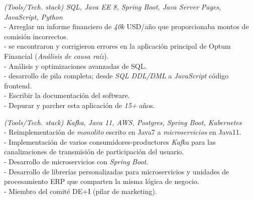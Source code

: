 \documentclass[]{CV-JuanCamiloFlorez}
\begin{document}
\begin{minipage}[t]{0.66\textwidth}
    \noindent
    \textit{(Tools/Tech. stack) SQL, Java EE 8, Spring Boot, Java Server Pages, JavaScript, Python} \\
        - Arreglar un informe financiero de \textit{40k} USD/año que proporcionaba montos de comisión incorrectos. \\
        - se encontraron y corrigieron errores en la aplicación principal de Optum Financial (\textit{Análisis de causa raíz}). \\
        - Análisis y optimizaciones avanzadas de SQL. \\
        - desarrollo de pila completa; desde \textit{SQL DDL/DML} a \textit{JavaScript} código frontend. \\
        - Escribir la documentación del software. \\
        - Depurar y parcher esta aplicación de \textit{15+} años. \\
        \sectionsep

    \noindent
    \textit{(Tools/Tech. stack) Kafka, Java 11, AWS, Postgres, Spring Boot, Kubernetes} \\
        - Reimplementación de \textit{monolito} escrito en Java7 a \textit{microservicios} en Java11. \\
        - Implementación de varios consumidores-productores \textit{Kafka} para las canalizaciones de transmisión de participación del usuario. \\
        - Desarrollo de microservicios con \textit{Spring Boot}. \\
        - Desarrollo de librerías personalizadas para microservicios y unidades de procesamiento ERP que comparten la misma lógica de negocio. \\
        - Miembro del comité DE+I (pilar de marketing). \\
        \sectionsep


\end{minipage}
\end{document}
